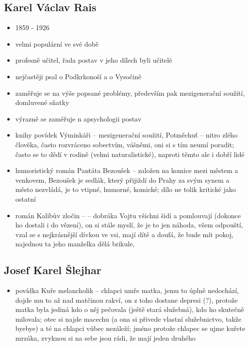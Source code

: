 \documentclass{article}
\begin{document}
\subsection{Karel Václav Rais}
\begin{itemize}
  \item 1859 - 1926
  \item velmi populární ve své době
  \item profesně učitel, řada postav v jeho dílech byli učitelé
  \item nejčastěji psal o Podkrkonoší a o Vysočině
  \item zaměřuje se na výše popsané problémy, především pak mezigenerační soužití, domluvené sňatky
  \item výrazně se zaměřuje n apsychologii postav
  \item knihy povídek Výminkáři -- mezigenerační soužití, Potměchuť -- nitro zlého člověka, často rozvráceno sobectvím, vášněmi, oni si s tím neumí poradit; často se to dědí v rodině (velmi naturalistické), naproti těmto ale i dobří lidé
  \item humoristický román Pantáta Bezoušek -- založen na komice mezi městem a venkovem, Bezoušek je sedlák, který přijiždí do Prahy za svým synem a město nezvládá, je to vtipné, humorné, komické; dílo ne tolik kritické jako ostatní
  \item román Kalibův zločin --  -- dobráka Vojtu všichni šidí a pomlouvají (dokonce ho dostali i do vězení), on si stále myslí, že je to jen náhoda, všem odpouští, vzal se s nejkrásnější dívkou ve vsi, mají dítě a doufá, že bude mít pokoj, najednou ta jeho manželka dělá brikule,
\end{itemize}

\subsection{Josef Karel Šlejhar}
\begin{itemize}
  \item povídka Kuře melancholik -- chlapci umře matka, jemu to úplně nedochází, dojde mu to až nad matčinou rakví, on z toho dostane depresi (?), protože matka byla jediná kdo o něj pečovala (ještě stará služebná), kdo ho skutečně milovala; otec si najde macechu (a ona si přivede vlastní služebnictvo, takže byebye) a té na chlapci vůbec nezáleží; jméno protože chlapec se ujme kuřete mrzáka, zvyknou si na sebe jsou rádi, že mají jeden druhého
\end{itemize}
\end{document}
